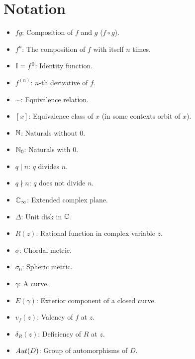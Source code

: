 
\chapter*{Notation}

{
\centering

\vspace{1em}
\begin{itemize}
    \item $fg$: Composition of $f$ and $g$ ($f \circ g$).
    \item $f^n$: The composition of $f$ with itself $n$ times.
    \item $\mathrm{I} = f^0$: Identity function.
    \item $f^{(n)}$: $n$-th derivative of $f$.
    \item $\sim$: Equivalence relation.
    \item $[x]$: Equivalence class of $x$ (in some contexts orbit of $x$).
    \item $\mathbb{N}$: Naturals without $0$.
    \item $\mathbb{N}_0$: Naturals with $0$.
    \item $q \mid n$: $q$ divides $n$.
    \item $q \nmid n$: $q$ does not divide $n$.
\end{itemize}

\vspace{2em}
\vspace{1em}
\begin{itemize}
    \item $\mathbb{C}_\infty$: Extended complex plane.
    \item $\Delta$: Unit disk in $\mathbb{C}$.
    \item $R(z)$: Rational function in complex variable $z$.
    \item $\sigma$: Chordal metric.
    \item $\sigma_0$: Spheric metric.
    \item $\gamma$: A curve.
    \item $E(\gamma)$: Exterior component of a closed curve.
    \item $v_f(z)$: Valency of $f$ at $z$.
    \item $\delta_R(z)$: Deficiency of $R$ at $z$.
    \item $\mathop{Aut}({D})$: Group of automorphisms of $D$.
\end{itemize}

}
